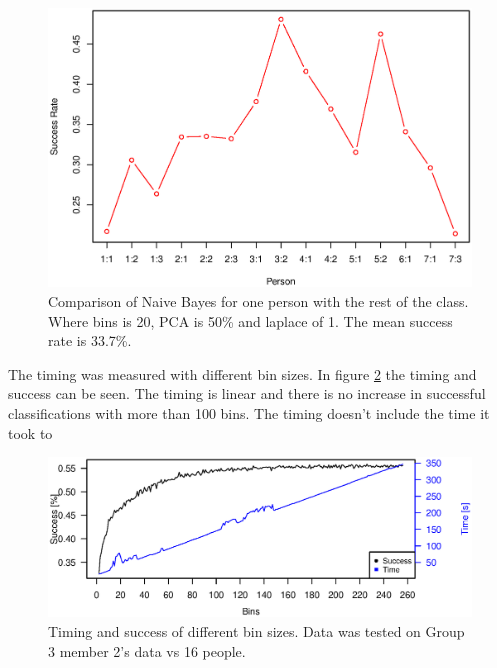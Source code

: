 \begin{figure}[H]
\centering
\includegraphics[width = \textwidth]{graphics/graph_baye_comparison}
\caption{Comparison of Naive Bayes for one person with the rest of the class.
Where bins is 20, PCA is 50\% and laplace of 1. The mean success rate is 33.7\%.}
\label{fig:comp_naiveBayes}
\end{figure}

The timing was measured with different bin sizes. 
In figure \ref{fig:baye_timing} the timing and success can be seen.
The timing is linear and there is no increase in successful classifications with more than 100 bins. 
The timing doesn't include the time it took to 

\begin{figure}
\centering
\includegraphics[width = \textwidth]{graphics/baye_timing_bins}
\caption[Timing with different bin sizes]{Timing and success of different bin sizes. Data was tested on Group 3 member 2's data vs 16 people.}
\label{fig:baye_timing}
\end{figure}
